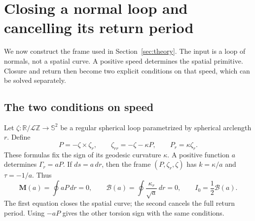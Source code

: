 \documentclass[11pt]{amsart}
\theoremstyle{definition}
\theoremstyle{remark}
\newcommand{\R}{\mathbb R}\newcommand{\Sph}{\mathbb S}
\numberwithin{equation}{section}
\begin{document}
\section{Closing a normal loop and cancelling its return period}
\label{sec:structural-balance}
We now construct the frame used in Section~\ref{sec:theory}. The input is
a loop of normals, not a spatial curve. A positive speed determines the
spatial primitive. Closure and return then become two explicit conditions
on that speed, which can be solved separately.

\subsection{The two conditions on speed}
Let $\zeta:\R/\mathcal L\mathbb Z\to\Sph^2$ be a regular spherical loop
parametrized by spherical arclength $r$. Define
\begin{equation}\label{eq:structural-normal-frame}
 P=-\zeta\times\zeta_r,\qquad
 \zeta_{rr}=-\zeta-\kappa P,\qquad P_r=\kappa\zeta_r.
\end{equation}
These formulas fix the sign of its geodesic curvature $\kappa$.
A positive function $a$ determines $\Gamma_r=aP$. If $ds=a\,dr$,
then the frame $(P,\zeta_r,\zeta)$ has $k=\kappa/a$ and $\tau=-1/a$.
Thus
\begin{equation}\label{eq:structural-moments}
 \mathbf M(a)=\oint aP\,dr=0,\qquad
 \mathscr B(a)=\oint\frac{\kappa_r}{\sqrt a}\,dr=0,
 \qquad I_0=\frac12\mathscr B(a).
\end{equation}
The first equation closes the spatial curve; the second cancels the full
return period. Using $-aP$ gives the other torsion sign with the same
conditions.
\end{document}
